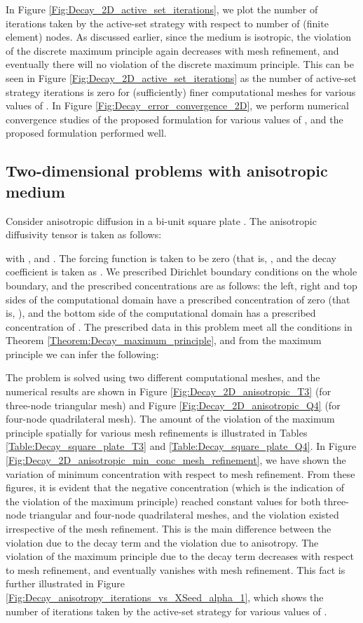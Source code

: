 \documentclass[11pt]{amsart}
\begin{document}
In Figure \ref{Fig:Decay_2D_active_set_iterations}, we plot the number of iterations taken by 
the active-set strategy with respect to number of (finite element) nodes. As discussed earlier, 
since the medium is isotropic, the violation of the discrete maximum principle again decreases 
with mesh refinement, and eventually there will no violation of the discrete maximum principle. 
This can be seen in Figure \ref{Fig:Decay_2D_active_set_iterations} as the number of 
active-set strategy iterations is zero for (sufficiently) finer computational meshes for various 
values of .
In Figure \ref{Fig:Decay_error_convergence_2D}, we perform numerical convergence studies of 
the proposed formulation for various values of , and the proposed formulation performed 
well. 

\subsection{Two-dimensional problems with anisotropic medium}
Consider anisotropic diffusion in a bi-unit square plate . 
The anisotropic diffusivity tensor is taken as follows:

with ,  and . The forcing function is taken to 
be zero (that is, , and the decay coefficient is taken 
as . We prescribed Dirichlet boundary conditions on the whole boundary, and 
the prescribed concentrations are as follows: the left, right and top sides of the 
computational domain have a prescribed concentration of zero (that is, ), and the bottom side of the computational domain has 
a prescribed concentration of . The prescribed data in this problem meet all the conditions in Theorem 
\ref{Theorem:Decay_maximum_principle}, and from the maximum principle we can infer the 
following:


The problem is solved using two different computational meshes, and the numerical results 
are shown in Figure \ref{Fig:Decay_2D_anisotropic_T3} (for three-node triangular mesh) 
and Figure \ref{Fig:Decay_2D_anisotropic_Q4} (for four-node quadrilateral mesh). 
The amount of the violation of the maximum principle spatially for various mesh 
refinements is illustrated in Tables \ref{Table:Decay_square_plate_T3} and 
\ref{Table:Decay_square_plate_Q4}. 
In Figure \ref{Fig:Decay_2D_anisotropic_min_conc_mesh_refinement}, we have 
shown the variation of minimum concentration with respect to mesh refinement. From 
these figures, it is evident that the negative concentration (which is the indication 
of the violation of the maximum principle) reached constant values for both 
three-node triangular and four-node quadrilateral meshes, and the violation 
existed irrespective of the mesh refinement.
This is the main difference between the violation due to the decay term and the violation 
due to anisotropy. The violation of the maximum principle due to the decay term decreases 
with respect to mesh refinement, and eventually vanishes with mesh refinement. This fact is 
further illustrated in Figure \ref{Fig:Decay_anisotropy_iterations_vs_XSeed_alpha_1}, which 
shows the number of iterations taken by the active-set strategy for various values of . 
\end{document}
